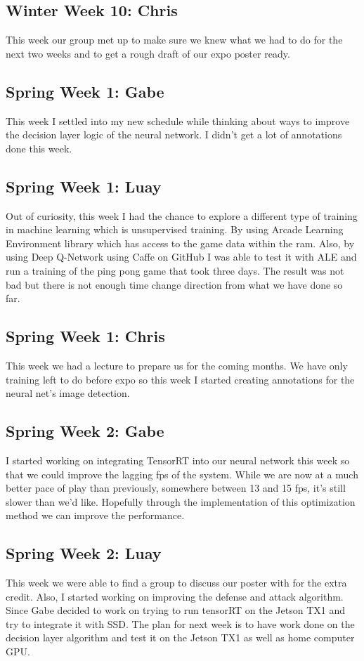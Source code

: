\documentclass[onecolumn, draftclsnofoot,10pt, compsoc]{IEEEtran}
\begin{document}
\subsection{Winter Week 10: Chris}
This week our group met up to make sure we knew what we had to do for the next two weeks and to get a rough draft of our expo poster ready.
\subsection{Spring Week 1: Gabe}
This week I settled into my new schedule while thinking about ways to improve the decision layer logic of the neural network. I didn't get a lot of annotations done this week.
\subsection{Spring Week 1: Luay}
Out of curiosity, this week I had the chance to explore a different type of training in machine learning which is unsupervised training. By using Arcade Learning Environment library which has access to the game data within the ram. Also, by using Deep Q-Network using Caffe on GitHub I was able to test it with ALE and run a training of the ping pong game that took three days. The result was not bad but there is not enough time change direction from what we have done so far.
\subsection{Spring Week 1: Chris}
This week we had a lecture to prepare us for the coming months. We have only training left to do before expo so this week I started creating annotations for the neural net's image detection.
\subsection{Spring Week 2: Gabe}
I started working on integrating TensorRT into our neural network this week so that we could improve the lagging fps of the system. While we are now at a much better pace of play than previously, somewhere between 13 and 15 fps, it's still slower than we'd like. Hopefully through the implementation of this optimization method we can improve the performance.
\subsection{Spring Week 2: Luay}
This week we were able to find a group to discuss our poster with for the extra credit. Also, I started working on improving the defense and attack algorithm. Since Gabe decided to work on trying to run tensorRT on the Jetson TX1 and try to integrate it with SSD. The plan for next week is to have work done on the decision layer algorithm and test it on the Jetson TX1 as well as home computer GPU.
\end{document}
